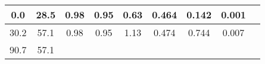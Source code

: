 \documentclass[a4paper,10pt]{article}
\begin{document}
\begin{longtable}{
     |
%    
    c|
%    
    c|
%    
    c|
%    
    c|
%    
    c|
%    
    c|
%    
    c|
%    
    c|
%    
    c|
%    
    }
        

%        

%        
        0.0
%        

%        

%        
        & 28.5
%        

%        

%        
        & 0.98
%        

%        

%        
        & 0.95
%        

%        

%        
        & 0.63
%        

%        

%        
        & 0.464
%        

%        

%        
        & 0.142
%        

%        

%        
        & 0.001
%        

%        
        \\
        \hline

        

%        

%        
        30.2
%        

%        

%        
        & 57.1
%        

%        

%        
        & 0.98
%        

%        

%        
        & 0.95
%        

%        

%        
        & 1.13
%        

%        

%        
        & 0.474
%        

%        

%        
        & 0.744
%        

%        

%        
        & 0.007
%        

%        
        \\
        \hline

        

%        

%        
        90.7
%        

%        

%        
        & 57.1
%        


\end{longtable}
\end{document}
